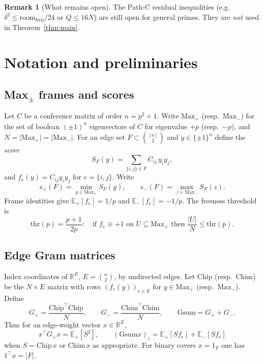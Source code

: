 \documentclass[11pt,a4paper]{article}
\theoremstyle{plain}
\theoremstyle{definition}
\newtheorem{remark}[theorem]{Remark}
\newcommand{\Maxp}{\mathrm{Max}_{+}}
\newcommand{\Maxm}{\mathrm{Max}_{-}}
\newcommand{\Gsum}{\mathrm{Gsum}}
\newcommand{\thr}{\mathrm{thr}}
\newcommand{\ES}{\mathbb{E}}
\begin{document}
\begin{remark}[What remains open]
The Path-C residual inequalities (e.g.\ $\delta^2\le\mathrm{room}_{\mathrm{hyp}}/24$ or
$Q\le16N$) are still open for general primes. They are \emph{not} used in
Theorem~\ref{thm:main}.
\end{remark}

\section{Notation and preliminaries}

\subsection{Max$_{\pm}$ frames and scores}

Let $C$ be a conference matrix of order $n=p^2+1$.
Write $\Maxp$ (resp.\ $\Maxm$) for the set of boolean $(\pm1)^n$ eigenvectors of $C$ for
eigenvalue $+p$ (resp.\ $-p$), and $N=\lvert\Maxp\rvert=\lvert\Maxm\rvert$.
For an edge set $F\subset\binom{[n]}{2}$ and $y\in\{\pm1\}^n$ define the \emph{score}
\[
S_F(y)=\sum_{\{i,j\}\in F} C_{ij}\,y_i y_j,
\]
and $f_e(y)=C_{ij}y_i y_j$ for $e=\{i,j\}$.
Write
\[
s_+(F)=\min_{y\in\Maxp}S_F(y),\qquad
s_-(F)=\max_{z\in\Maxm}S_F(z).
\]
Frame identities give $\ES_+[f_e]=1/p$ and $\ES_-[f_e]=-1/p$.
The freeness threshold is
\begin{equation}
\label{eq:thr}
\thr(p)=\frac{p+1}{2p}:
\quad
\text{if }f_e\equiv+1\text{ on }U\subseteq\Maxp\text{ then }
\frac{\lvert U\rvert}{N}\le\thr(p).
\end{equation}

\subsection{Edge Gram matrices}

Index coordinates of $\mathbb{R}^E$, $E=\binom{n}{2}$, by undirected edges.
Let $\mathrm{Chip}$ (resp.\ $\mathrm{Chim}$) be the $N\times E$ matrix with rows
$(f_e(y))_{e\in E}$ for $y\in\Maxp$ (resp.\ $\Maxm$).
Define
\begin{equation}
\label{eq:gsum}
G_+=\frac{\mathrm{Chip}^\top\mathrm{Chip}}{N},\qquad
G_-=\frac{\mathrm{Chim}^\top\mathrm{Chim}}{N},\qquad
\Gsum=G_++G_-.
\end{equation}
Thus for an edge-weight vector $x\in\mathbb{R}^E$,
\[
x^\top G_+ x=\ES_+[S^2],\qquad
(\Gsum x)_e=\ES_+[S f_e]+\ES_-[S f_e]
\]
when $S=\mathrm{Chip}\,x$ or $\mathrm{Chim}\,x$ as appropriate.
For binary covers $x=1_F$ one has $1^\top x=\lvert F\rvert$.
\end{document}
